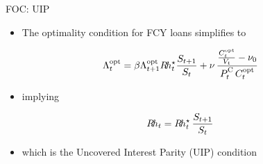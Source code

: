 \begin{frame}{FOC: UIP}
  \begin{itemize}
    \item The optimality condition for FCY loans simplifies to    
  \end{itemize}
  \vspace*{-3ex}
  \begin{align*}
    \Lambda^\opt_t =\beta\Lambda^\opt_{t+1} \Rh^{\star}_t \frac{S_{t+1}}{S_t} + \nu\,\frac{\frac{C^\opt_t}{V_t}-\nu_0}{P^\cc_t\,{C^\opt_t}}
  \end{align*}
  \vspace*{-2ex}
  \begin{itemize}
    \item implying   
  \end{itemize}
  \vspace*{-2ex}
  \begin{align*}
    R\hspace{-0.15em}h_t = R\hspace{-0.15em}h^{\star}_t \, \frac{S_{t+1}}{S_t} 
  \end{align*}
  \vspace*{-2ex}
  \begin{itemize}
    \item which is the Uncovered Interest Parity (UIP) condition
  \end{itemize}
\end{frame} 

      